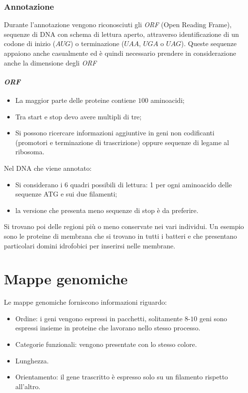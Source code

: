 		\subsubsection{Annotazione}
		Durante l'annotazione vengono riconosciuti gli \emph{ORF} (Open Reading Frame), sequenze di DNA con schema di lettura aperto, attraverso identificazione di un codone di inizio ($AUG$) o terminazione ($UAA$, $UGA$ o $UAG$). 
		Queste sequenze appaiono anche casualmente ed \`e quindi necessario prendere in considerazione anche la dimensione degli \emph{ORF}

			\paragraph{\emph{ORF}}
			\begin{itemize}
    				\item La maggior parte delle proteine contiene $100$ aminoacidi; 
    				\item Tra start e stop devo avere multipli di tre;
    				\item Si possono ricercare informazioni aggiuntive in geni non codificanti (promotori e terminazione di trascrizione) oppure sequenze di legame al ribosoma.
			\end{itemize}
			Nel DNA che viene annotato:
			\begin{itemize}
    				\item Si considerano i 6 quadri possibili di lettura: 1 per ogni aminoacido delle sequenze ATG e sui due filamenti; 
    				\item la versione che presenta meno sequenze di stop \`e da preferire. 
			\end{itemize}
			Si trovano poi delle regioni pi\`u o meno conservate nei vari individui. 
			Un esempio sono le proteine di membrana che si trovano in tutti i batteri e che presentano particolari domini idrofobici per inserirsi nelle membrane. 

\section{Mappe genomiche}
Le mappe genomiche forniscono informazioni riguardo:
\begin{multicols}{2}
	\begin{itemize}
		\item Ordine: i geni vengono espressi in pacchetti, solitamente $8$-$10$ geni sono espressi insieme in proteine che lavorano nello stesso processo.
		\item Categorie funzionali: vengono presentate con lo stesso colore.
    		\item Lunghezza.
    		\item Orientamento: il gene trascritto \`e espresso solo su un filamento rispetto all'altro.
	\end{itemize}
\end{multicols}

